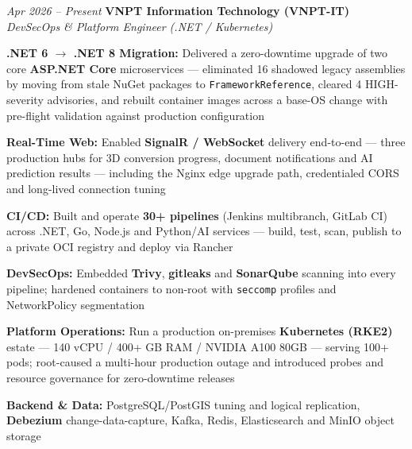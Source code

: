 \begin{twocolentry}{\textit{Apr 2026 -- Present}}
    \textbf{VNPT Information Technology (VNPT-IT)} \\[4pt]
    \textit{DevSecOps \& Platform Engineer (.NET / Kubernetes)}
\end{twocolentry}
\begin{onecolentry}
    \begin{highlights}
        \item \textbf{.NET 6 $\rightarrow$ .NET 8 Migration:} Delivered a zero-downtime upgrade of two core \textbf{ASP.NET Core} microservices --- eliminated 16 shadowed legacy assemblies by moving from stale NuGet packages to \texttt{FrameworkReference}, cleared 4 HIGH-severity advisories, and rebuilt container images across a base-OS change with pre-flight validation against production configuration
        \item \textbf{Real-Time Web:} Enabled \textbf{SignalR / WebSocket} delivery end-to-end --- three production hubs for 3D conversion progress, document notifications and AI prediction results --- including the Nginx edge upgrade path, credentialed CORS and long-lived connection tuning
        \item \textbf{CI/CD:} Built and operate \textbf{30+ pipelines} (Jenkins multibranch, GitLab CI) across .NET, Go, Node.js and Python/AI services --- build, test, scan, publish to a private OCI registry and deploy via Rancher
        \item \textbf{DevSecOps:} Embedded \textbf{Trivy}, \textbf{gitleaks} and \textbf{SonarQube} scanning into every pipeline; hardened containers to non-root with \texttt{seccomp} profiles and NetworkPolicy segmentation
        \item \textbf{Platform Operations:} Run a production on-premises \textbf{Kubernetes (RKE2)} estate --- 140 vCPU / 400+ GB RAM / NVIDIA A100 80GB --- serving 100+ pods; root-caused a multi-hour production outage and introduced probes and resource governance for zero-downtime releases
        \item \textbf{Backend \& Data:} PostgreSQL/PostGIS tuning and logical replication, \textbf{Debezium} change-data-capture, Kafka, Redis, Elasticsearch and MinIO object storage
    \end{highlights}
\end{onecolentry}
\vspace{0.2 cm}

